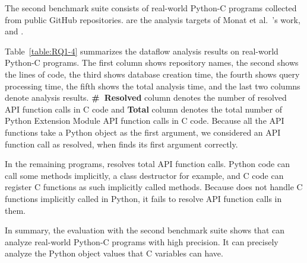 


The second benchmark suite consists of  real-world Python-C programs
collected from public GitHub repositories.  are the analysis
targets of Monat et al.~\cite{sas2021}'s work, and .

Table~\ref{table:RQ1-4} summarizes the dataflow analysis results on 
real-world Python-C programs. 
The first column shows repository names, the second shows the lines of code,
the third shows database creation time,
the fourth shows query processing time, the fifth shows the total analysis time,
and the last two columns denote analysis results.
{\bf \#~Resolved} column denotes the number of resolved API function calls in C code and
{\bf Total} column denotes the total number of Python Extension Module API function
calls in C code. 
Because all the API functions take a Python object as the first argument, we
considered an API function call as resolved, when \ours finds its first argument
correctly. 

In the remaining  programs, \ours resolves  total
API function calls. 
Python code can call some methods implicitly, a class destructor for example, and C
code can register C functions as such implicitly called methods.
Because \ours does not handle C functions implicitly called in Python, it
fails to resolve API function calls in them.

In summary, the evaluation with the second benchmark suite shows that
\ours can analyze real-world Python-C programs with high precision.
It can precisely analyze the Python object values that C variables can have.


